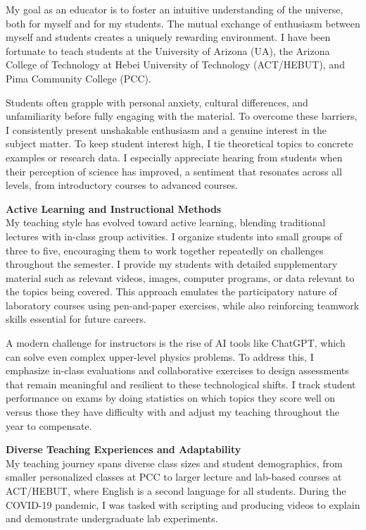 \documentclass[11pt]{article}
\begin{document}
\noindent
My goal as an educator is to foster an intuitive understanding of the universe, both for myself and for my students. The mutual exchange of enthusiasm between myself and students creates a uniquely rewarding environment. I have been fortunate to teach students at the University of Arizona (UA), the Arizona College of Technology at Hebei University of Technology (ACT/HEBUT), and Pima Community College (PCC).

Students often grapple with personal anxiety, cultural differences, and unfamiliarity before fully engaging with the material. To overcome these barriers, I consistently present unshakable enthusiasm and a genuine interest in the subject matter. To keep student interest high, I tie theoretical topics to concrete examples or research data. I especially appreciate hearing from students when their perception of science has improved, a sentiment that resonates across all levels, from introductory courses to advanced courses.

\vspace{1em}

{\noindent\Large\textbf{Active Learning and Instructional Methods}}\\
My teaching style has evolved toward active learning, blending traditional lectures with in-class group activities. I organize students into small groups of three to five, encouraging them to work together repeatedly on challenges throughout the semester. I provide my students with detailed supplementary material such as relevant videos, images, computer programs, or data relevant to the topics being covered. This approach emulates the participatory nature of laboratory courses using pen-and-paper exercises, while also reinforcing teamwork skills essential for future careers. 

A modern challenge for instructors is the rise of AI tools like ChatGPT, which can solve even complex upper-level physics problems. To address this, I emphasize in-class evaluations and collaborative exercises to design assessments that remain meaningful and resilient to these technological shifts. I track student performance on exams by doing statistics on which topics they score well on versus those they have difficulty with and adjust my teaching throughout the year to compensate.

\vspace{1em}

{\noindent\Large\textbf{Diverse Teaching Experiences and Adaptability}}\\
My teaching journey spans diverse class sizes and student demographics, from smaller personalized classes at PCC to larger lecture and lab-based courses at ACT/HEBUT, where English is a second language for all students. During the COVID-19 pandemic, I was tasked with scripting and producing videos to explain and demonstrate undergraduate lab experiments. 
\end{document}
